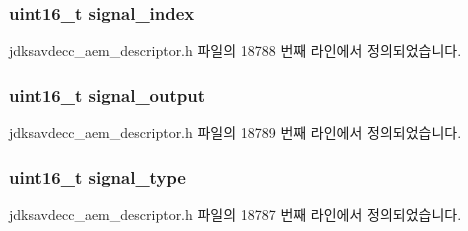 \subsubsection[{\texorpdfstring{signal\+\_\+index}{signal_index}}]{\setlength{\rightskip}{0pt plus 5cm}uint16\+\_\+t signal\+\_\+index}\hypertarget{structjdksavdecc__descriptor__control_ae2e81a95ee9ad83f1fe22b6a1ee29075}{}\label{structjdksavdecc__descriptor__control_ae2e81a95ee9ad83f1fe22b6a1ee29075}


jdksavdecc\+\_\+aem\+\_\+descriptor.\+h 파일의 18788 번째 라인에서 정의되었습니다.

\subsubsection[{\texorpdfstring{signal\+\_\+output}{signal_output}}]{\setlength{\rightskip}{0pt plus 5cm}uint16\+\_\+t signal\+\_\+output}\hypertarget{structjdksavdecc__descriptor__control_ab4b91864e6fc335d7e86536d9f4461e4}{}\label{structjdksavdecc__descriptor__control_ab4b91864e6fc335d7e86536d9f4461e4}


jdksavdecc\+\_\+aem\+\_\+descriptor.\+h 파일의 18789 번째 라인에서 정의되었습니다.

\subsubsection[{\texorpdfstring{signal\+\_\+type}{signal_type}}]{\setlength{\rightskip}{0pt plus 5cm}uint16\+\_\+t signal\+\_\+type}\hypertarget{structjdksavdecc__descriptor__control_a248e60ef99d5ed1779989d1dd6b6dc5a}{}\label{structjdksavdecc__descriptor__control_a248e60ef99d5ed1779989d1dd6b6dc5a}


jdksavdecc\+\_\+aem\+\_\+descriptor.\+h 파일의 18787 번째 라인에서 정의되었습니다.

